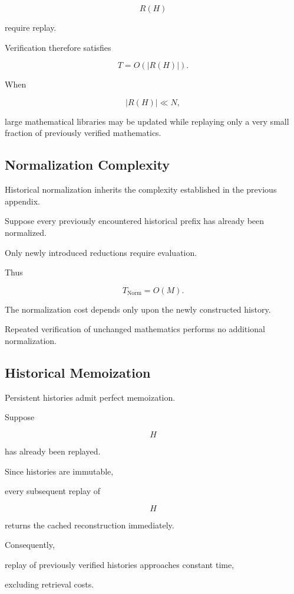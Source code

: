 \documentclass[12pt,oneside]{article}
\theoremstyle{definition}
\theoremstyle{remark}
\begin{document}
\[
R(H)
\]

require replay.

Verification therefore satisfies

\[
T
=
O(|R(H)|).
\]

When

\[
|R(H)|
\ll
N,
\]

large mathematical libraries may be updated while replaying only a very small
fraction of previously verified mathematics.


\subsection{Normalization Complexity}

Historical normalization inherits the complexity established in the previous
appendix.

Suppose every previously encountered historical prefix has already been
normalized.

Only newly introduced reductions require evaluation.

Thus

\[
T_{\mathrm{Norm}}
=
O(M).
\]

The normalization cost depends only upon the newly constructed history.

Repeated verification of unchanged mathematics performs no additional
normalization.


\subsection{Historical Memoization}

Persistent histories admit perfect memoization.

Suppose

\[
H
\]

has already been replayed.

Since histories are immutable,

every subsequent replay of

\[
H
\]

returns the cached reconstruction immediately.

Consequently,

replay of previously verified histories approaches constant time,

excluding retrieval costs.
\end{document}
